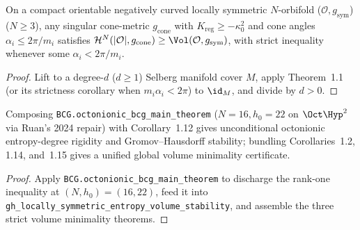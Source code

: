 \begin{corollary}
\label{cor_orbifold_volume_minimality}
\leanok
{}
On a compact orientable negatively curved locally symmetric $N$-orbifold ($\mathcal{O}, g_{\mathrm{sym}}$)
($N \ge 3$), any singular cone-metric $g_{\mathrm{cone}}$ with $K_{\mathrm{reg}} \ge -\kappa_0^2$ and
cone angles $\alpha_i \le 2\pi / m_i$ satisfies $\mathcal{H}^N(|\mathcal{O}|, g_{\mathrm{cone}}) \ge \Vol(\mathcal{O}, g_{\mathrm{sym}})$,
with strict inequality whenever some $\alpha_i < 2\pi / m_i$.
\end{corollary}
\begin{proof}\leanok
Lift to a degree-$d$ ($d \ge 1$) Selberg manifold cover $M$, apply Theorem~1.1 (or its strictness
corollary when $m_i \alpha_i < 2\pi$) to $\id_M$, and divide by $d > 0$.
\end{proof}

\begin{theorem}
\label{thm_master_catalog}
\leanok
{}
Composing \texttt{BCG.octonionic\_bcg\_main\_theorem} ($N = 16, h_0 = 22$ on $\Oct\Hyp^2$ via Ruan's
2024 repair) with Corollary~1.12 gives unconditional octonionic entropy-degree rigidity and
Gromov--Hausdorff stability; bundling Corollaries~1.2, 1.14, and~1.15 gives a unified global volume
minimality certificate.
\end{theorem}
\begin{proof}\leanok
Apply \texttt{BCG.octonionic\_bcg\_main\_theorem} to discharge the rank-one inequality at
$(N, h_0) = (16, 22)$, feed it into \texttt{gh\_locally\_symmetric\_entropy\_volume\_stability},
and assemble the three strict volume minimality theorems.
\end{proof}

